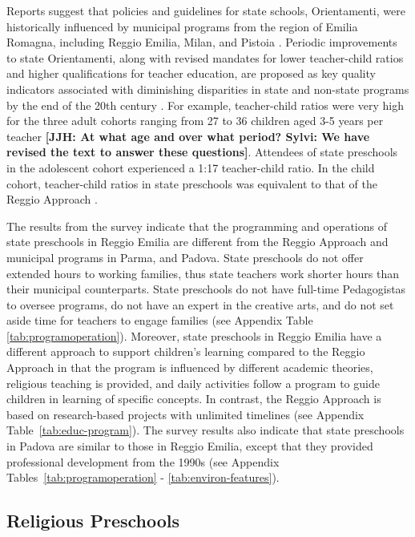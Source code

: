 Reports suggest that policies and guidelines for state schools, Orientamenti, were historically influenced by municipal programs from the region of Emilia Romagna, including Reggio Emilia, Milan, and Pistoia \citep{OECD_2001_Italy-Country-Note}. Periodic improvements to state Orientamenti, along with revised mandates for lower teacher-child ratios and higher qualifications for teacher education, are proposed as key quality indicators associated with diminishing disparities in state and non-state programs by the end of the 20th century \citep{Hohnerlein_2015_Development-and-Diffusion}. For example, teacher-child ratios were very high for the three adult cohorts ranging from 27 to 36 children aged 3-5 years per teacher \textbf{[JJH: At what age and over what period? Sylvi: We have revised the text to answer these questions]}. Attendees of state preschools in the adolescent cohort experienced a 1:17 teacher-child ratio. In the child cohort, teacher-child ratios in state preschools was equivalent to that of the Reggio Approach \citep{Hohnerlein_2015_Development-and-Diffusion}.

The results from the survey indicate that the programming and operations of state preschools in Reggio Emilia are different from the Reggio Approach and municipal programs in Parma, and Padova. State preschools do not offer extended hours to working families, thus state teachers work shorter hours than their municipal counterparts. State preschools do not have full-time Pedagogistas to oversee programs, do not have an expert in the creative arts, and do not set aside time for teachers to engage families (see Appendix Table \ref{tab:programoperation}). Moreover, state preschools in Reggio Emilia have a different approach to support children's learning compared to the Reggio Approach in that the program is  influenced by different academic theories, religious teaching is provided, and daily activities follow a program to guide children in learning of specific concepts. In contrast, the Reggio Approach is based on research-based projects with unlimited timelines (see Appendix Table~\ref{tab:educ-program}). The survey results also indicate that state preschools in Padova are similar to those in Reggio Emilia, except that they provided professional development from the 1990s (see Appendix Tables~\ref{tab:programoperation} - \ref{tab:environ-features}).

\subsection{Religious Preschools}


